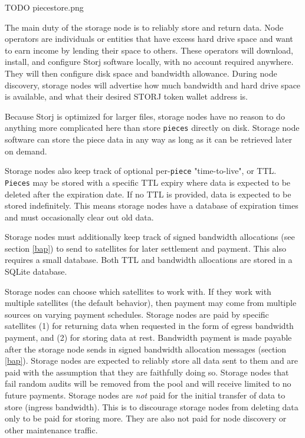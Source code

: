 \documentclass[11pt,fleqn,openany]{book}
\newcommand{\x}[1]{{\tt #1}} \newcommand{\code}[1]{{\em #1}}
\newcommand{\todo}[1]{{\color{red} TODO #1 }}
\begin{document}
\todo{piecestore.png}

The main duty of the storage node is to reliably store and return data.
Node operators
are individuals or entities that have excess hard drive space and want to earn
income by lending their space to others. These operators will
download,
install, and configure Storj software locally, with no account required
anywhere. They will then configure disk space and bandwidth allowance.
During node discovery, storage nodes will advertise how much bandwidth and
hard drive space is available, and what their desired STORJ token
wallet address is.

Because Storj is optimized for larger files, storage nodes have no reason to do
anything more complicated here than store \x{pieces} directly on disk. Storage
node software can store the piece data in any way as long as it can be
retrieved later on demand.

Storage nodes also keep track of optional per-\x{piece} "time-to-live", or TTL.
\x{Pieces} may be stored with a specific TTL expiry where data is expected to
be deleted after the expiration date. If no TTL is provided, data is expected
to be stored indefinitely. This means storage nodes have a database of
expiration
times and must occasionally clear out old data.

Storage nodes must additionally keep track of signed bandwidth allocations
(see section \ref{bap}) to send to
satellites for later settlement and payment. This also requires a small
database. Both TTL and bandwidth allocations are stored in a SQLite
\cite{sqlite} database.

Storage nodes can choose which satellites to work with. If they work
with multiple satellites (the default behavior), then payment may come from
multiple sources on varying payment schedules.
Storage nodes are paid by specific satellites (1) for returning data when
requested in
the form of egress bandwidth payment, and (2) for storing data at rest.
Bandwidth payment is made payable after
the storage node sends in signed bandwidth allocation messages
(section \ref{bap}).
Storage nodes are expected to reliably store all data sent to them and are
paid
with the assumption that they are faithfully doing so.
Storage nodes that fail random audits will be removed from the pool and will
receive
limited to no future payments.
Storage nodes are {\em not} paid for the initial transfer of data to store
(ingress
bandwidth). This is to discourage storage nodes from deleting data only to be
paid for
storing more. They are also not paid for node discovery or other
maintenance traffic.
\end{document}
